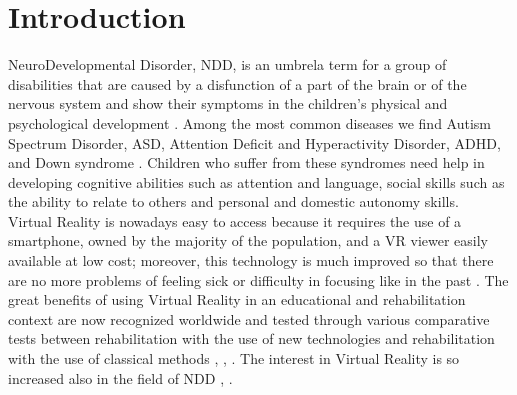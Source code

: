 \documentclass{sigchi-ext}
\begin{document}
\section{Introduction}
NeuroDevelopmental Disorder, NDD, is an umbrela term for a group of disabilities that are caused by a disfunction of a part of the brain or of the nervous system and show their symptoms in the children's physical and psychological development \cite{rif1}. Among the most common diseases we find Autism Spectrum Disorder, ASD, Attention Deficit and Hyperactivity Disorder, ADHD, and Down syndrome \cite{rif2}. Children who suffer from these syndromes need help in developing cognitive abilities such as attention and language, social skills such as the ability to relate to others and personal and domestic autonomy skills.\\
\medskip
 Virtual Reality is nowadays easy to access because it requires the use of a smartphone, owned by the majority of the population, and a VR viewer easily available at low cost; moreover, this technology is much improved so that there are no more problems of feeling sick or difficulty in focusing like in the past \cite{rif6}. The great benefits of using Virtual Reality in an educational and rehabilitation context are now recognized worldwide and tested through various comparative tests between rehabilitation with the use of new technologies and rehabilitation with the use of classical methods \cite{rif3}, \cite{rif4}, \cite{rif5}. The interest in Virtual Reality is so increased also in the field of NDD \cite{rif7}, \cite{rif8}. \\
\end{document}
